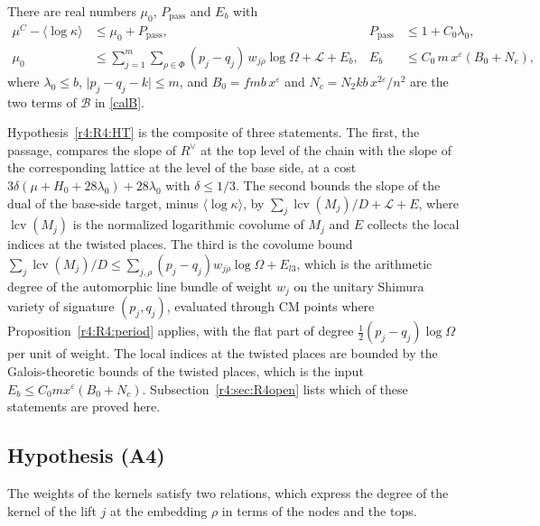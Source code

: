 \begin{hypothesis}\label{r4:R4:HT}
There are real numbers $\mu_0$, $P_{\mathrm{pass}}$ and $E_b$ with
\begin{align*}
\mu^C-\langle\log\kappa\rangle&\le\mu_0+P_{\mathrm{pass}},& P_{\mathrm{pass}}&\le1+C_0\lambda_0,\\
\mu_0&\le\sum_{j=1}^m\sum_{\rho\in\Phi}(p_j-q_j)\,w_{j\rho}\log\Omega+\mathcal L+E_b,& E_b&\le C_0\,m\,x^{\varepsilon}(B_0+N_c),
\end{align*}
where $\lambda_0\le b$, $\lvert p_j-q_j-k\rvert\le m$, and $B_0=fmb\,x^\varepsilon$ and $N_c=N_2kb\,x^{2\varepsilon}/n^2$ are the two terms of $\mathcal B$ in \eqref{calB}.
\end{hypothesis}

\begin{remark}\label{r4:R4:HTmech}
Hypothesis~\ref{r4:R4:HT} is the composite of three statements. The first, the passage, compares the slope of $R^\vee$ at the top level of the chain with the slope of the corresponding lattice at the level of the base side, at a cost $3\delta(\mu+H_0+28\lambda_0)+28\lambda_0$ with $\delta\le1/3$. The second bounds the slope of the dual of the base-side target, minus $\langle\log\kappa\rangle$, by $\sum_j\operatorname{lcv}(M_j)/D+\mathcal L+E$, where $\operatorname{lcv}(M_j)$ is the normalized logarithmic covolume of $M_j$ and $E$ collects the local indices at the twisted places. The third is the covolume bound $\sum_j\operatorname{lcv}(M_j)/D\le\sum_{j,\rho}(p_j-q_j)w_{j\rho}\log\Omega+E_{l3}$, which is the arithmetic degree of the automorphic line bundle of weight $w_j$ on the unitary Shimura variety of signature $(p_j,q_j)$, evaluated through CM points where Proposition~\ref{r4:R4:period} applies, with the flat part of degree $\frac12(p_j-q_j)\log\Omega$ per unit of weight. The local indices at the twisted places are bounded by the Galois-theoretic bounds of the twisted places, which is the input $E_b\le C_0mx^\varepsilon(B_0+N_c)$. Subsection~\ref{r4:sec:R4open} lists which of these statements are proved here.
\end{remark}

\subsection{Hypothesis (A4)}\label{r4:sec:R4A4}

The weights of the kernels satisfy two relations, which express the degree of the kernel of the lift $j$ at the embedding $\rho$ in terms of the nodes and the tops.

